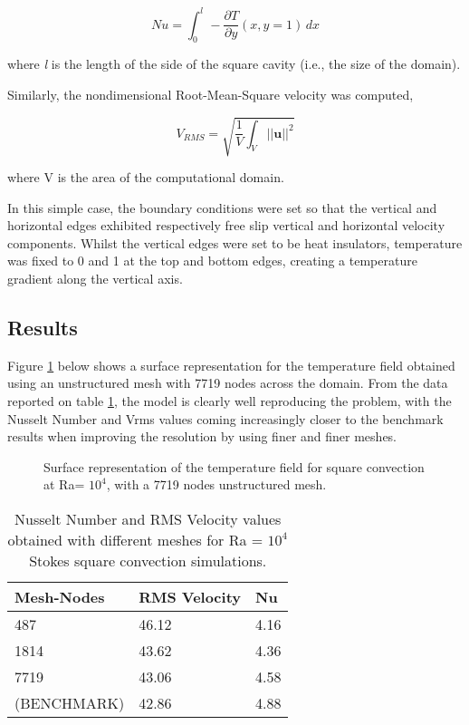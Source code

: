 \begin{equation}
Nu = \int_0^\textit{l} \! -\frac{\partial T}{\partial y} (x,y=1) \, dx
\end{equation}

where \textit{l} is the length of the side of the square cavity (i.e., the size of the domain).

Similarly, the nondimensional Root-Mean-Square velocity was computed,

\begin{equation}
V_{RMS} = \sqrt{\frac{1}{V} \int_V ||\textbf{u}||^2 }
\end{equation}

where V is the area of the computational domain.

In this simple case, the boundary conditions were set so that the vertical and horizontal edges exhibited respectively free slip vertical and horizontal velocity components. Whilst the vertical edges were set to be heat insulators, temperature was fixed to 0 and 1 at the top and bottom edges, creating a temperature gradient along the vertical axis.

\subsection{Results}

Figure \ref{Stokessquareconv1} below shows a surface representation for the temperature field obtained using an unstructured mesh with 7719 nodes across the domain. From the data reported on table \ref{Stokessquareconv2}, the model is clearly well reproducing the problem, with the Nusselt Number and Vrms values coming increasingly closer to the benchmark results when improving the resolution by using finer and finer meshes.

\begin{figure}[h!]
  \label{Stokessquareconv1}
  \centering
  \caption{Surface representation of the temperature field for square convection at Ra= $10^4$, with a 7719 nodes unstructured mesh.}
\end{figure}

\begin{table}[h!]
\centering
\begin{tabular}{lll}
\hline
\textbf{Mesh-Nodes} & \textbf{RMS Velocity} & \textbf{Nu} \\
\hline
487 & 46.12 & 4.16 \\
\hline
1814 & 43.62 & 4.36 \\ 
\hline
7719 & 43.06 & 4.58 \\
\hline
(BENCHMARK) & 42.86 & 4.88 \\
\hline
\end{tabular}
\label{Stokessquareconv2}
\caption{Nusselt Number and RMS Velocity values obtained with different meshes for Ra = $10^4$ Stokes square convection simulations.}
\end{table}


